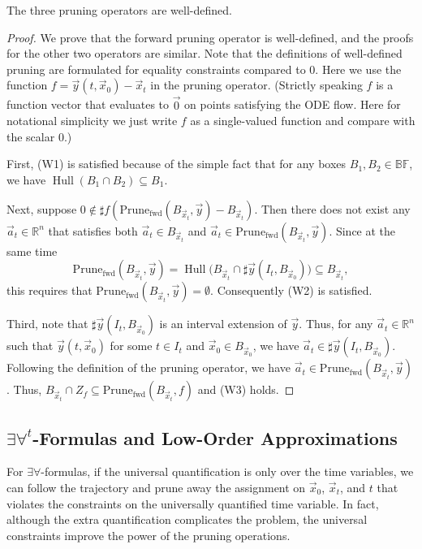 \documentclass[11pt]{article}
\DeclareMathOperator{\Hull}{Hull}
\begin{document}
\begin{theorem}
The three pruning operators are well-defined.
\end{theorem}

\begin{proof}
We prove that the forward pruning operator is well-defined, and the proofs for the other two operators are similar. Note that the definitions of well-defined pruning are formulated for equality constraints compared to 0. Here we use the function $f = \vec y (t, \vec x_0)-\vec x_t$ in the pruning operator. (Strictly speaking $f$ is a function vector that evaluates to $\vec 0$ on points satisfying the ODE flow. Here for notational simplicity we just write $f$ as a single-valued function and compare with the scalar $0$.)

First, (W1) is satisfied because of the simple fact that for any boxes $B_1,B_2\in \mathbb{BF}$, we have $\Hull(B_1\cap B_2)\subseteq B_1$.

Next, suppose $0\not\in\sharp f(\mathrm{Prune}_{\mathrm{fwd}}(B_{\vec x_t},\vec y)-B_{\vec x_t})$. Then there does not exist any $\vec a_t\in \mathbb{R}^n$ that satisfies both $\vec a_t\in B_{\vec x_t}$ and $\vec a_t\in \mathrm{Prune_{\mathrm{fwd}}}(B_{\vec x_t}, \vec y)$. Since at the same time
$$\mathrm{Prune}_{\mathrm{fwd}}(B_{\vec x_t}, \vec y) = \Hull\Big(B_{\vec x_t}\cap \sharp \vec y(I_t, B_{\vec x_0})\Big)\subseteq B_{\vec x_t},$$
this requires that $\mathrm{Prune}_{\mathrm{fwd}}(B_{\vec x_t}, \vec y) = \emptyset$. Consequently (W2) is satisfied.

Third, note that $\sharp \vec y(I_t, B_{\vec x_0})$ is an interval extension of $\vec y$. Thus, for any $\vec a_t\in \mathbb{R}^n$ such that $\vec y(t, \vec x_0)$ for some $t\in I_t$ and $\vec x_0\in B_{\vec x_0}$, we have $\vec a_t\in \sharp\vec y(I_t, B_{\vec x_0})$. Following the definition of the pruning operator, we have $\vec a_t\in \mathrm{Prune}_{\mathrm{fwd}}(B_{\vec x_t}, \vec y)$. Thus, $B_{\vec x_t}\cap Z_f \subseteq \mathrm{Prune}_{\mathrm{fwd}}(B_{\vec x_t},f)$ and (W3) holds.
\end{proof}

\subsection{$\exists\forall^t$-Formulas and Low-Order Approximations}

For $\exists\forall$-formulas, if the universal quantification is only over the time variables, we can follow the trajectory and prune away the assignment on $\vec x_0$, $\vec x_t$, and $t$ that violates the constraints on the universally quantified time variable. In fact, although the extra quantification complicates the problem, the universal constraints improve the power of the pruning operations.
\end{document}
